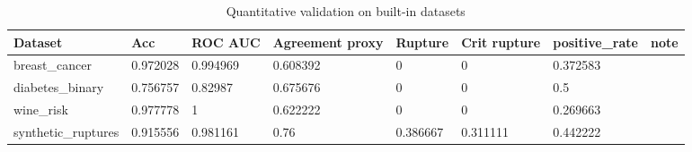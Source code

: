 \begin{table}[h]
\centering
\caption{Quantitative validation on built-in datasets}
\label{tab:dataset\_quantitative}
\begin{tabular}{|l|l|l|l|l|l|l|l|}
\hline
Dataset & Acc & ROC AUC & Agreement proxy & Rupture & Crit rupture & positive\_rate & note \\
\hline
breast\_cancer & 0.972028 & 0.994969 & 0.608392 & 0 & 0 & 0.372583 &  \\
\hline
diabetes\_binary & 0.756757 & 0.82987 & 0.675676 & 0 & 0 & 0.5 &  \\
\hline
wine\_risk & 0.977778 & 1 & 0.622222 & 0 & 0 & 0.269663 &  \\
\hline
synthetic\_ruptures & 0.915556 & 0.981161 & 0.76 & 0.386667 & 0.311111 & 0.442222 &  \\
\hline
\end{tabular}
\end{table}
